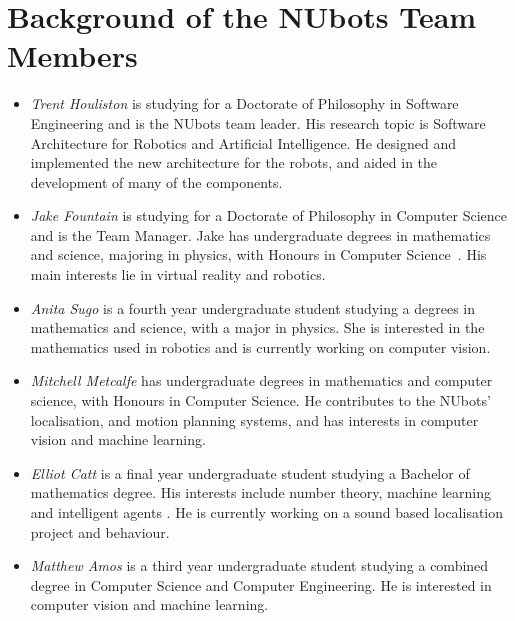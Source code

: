 \documentclass{llncs}
\begin{document}

\section{Background of the NUbots Team Members}

\begin{itemize}
\item \emph{Trent Houliston} is studying for a Doctorate of Philosophy in Software Engineering and is the NUbots team leader. His research topic is Software Architecture for Robotics and Artificial Intelligence. He designed and implemented the new architecture for the robots, and aided in the development of many of the components.

\item \emph{Jake Fountain} is studying for a Doctorate of Philosophy in Computer Science and is the Team Manager. Jake has undergraduate degrees in mathematics and science, majoring in physics, with Honours in Computer Science~\cite{FountainChalup2015}. His main interests lie in virtual reality and robotics.

\item \emph{Anita Sugo} is a fourth year undergraduate student studying a degrees in mathematics and science, with a major in physics. She is interested in the mathematics used in robotics and is currently working on computer vision.

\item \emph{Mitchell Metcalfe} has undergraduate degrees in mathematics and computer science, with Honours in Computer Science. He contributes to the NUbots' localisation, and motion planning systems, and has interests in computer vision and machine learning.

\item \emph{Elliot Catt} is a final year undergraduate student studying a Bachelor of mathematics degree. His interests include number theory,  machine learning and intelligent agents \cite{CattCoonsVelich}. He is currently working on a sound based localisation project and behaviour.

\item \emph{Matthew Amos} is a third year undergraduate student studying a combined degree in Computer Science and Computer Engineering. He is interested in computer vision and machine learning.


\end{itemize}
\end{document}
